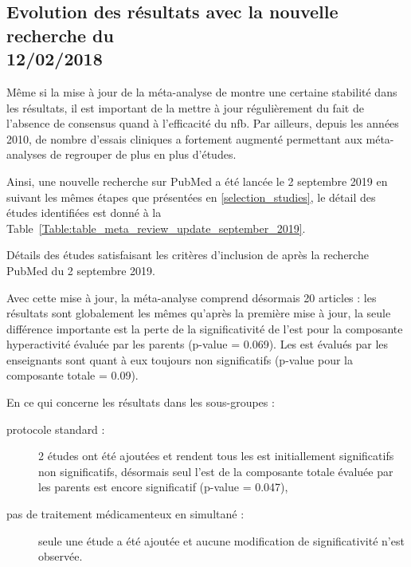 \subsection{Evolution des résultats avec la nouvelle recherche du \\ 12/02/2018}

Même si la mise à jour de la méta-analyse de \citet{Cortese2016} montre une certaine stabilité dans les résultats, il est important de la mettre à jour
régulièrement du fait de l'absence de consensus quand à l'efficacité du \gls{nfb}. Par ailleurs, depuis les années 2010, de nombre d'essais cliniques 
a fortement augmenté permettant aux méta-analyses de regrouper de plus en plus d'études. 

Ainsi, une nouvelle recherche sur PubMed a été lancée le 2 septembre 2019 en suivant les mêmes étapes que présentées en \ref{selection_studies}, le détail
des études identifiées est donné à la Table~\ref{Table:table_meta_review_update_september_2019}.

\begin{table}[h!]
  \centering
  \caption{Détails des études satisfaisant les critères d'inclusion de \citep{Cortese2016} après la recherche PubMed du 2 septembre 2019.}
  
  \label{Table:table_meta_review_update_september_2019}
\end{table} 

Avec cette mise à jour, la méta-analyse comprend désormais 20 articles : les résultats sont globalement les mêmes qu'après la première mise à jour, la seule
différence importante est la perte de la significativité de l'\gls{est} pour la composante hyperactivité évaluée par les parents (p-value = 0.069).
Les \gls{est} évalués par les enseignants sont quant à eux toujours non significatifs (p-value pour la composante totale =  0.09).

En ce qui concerne les résultats dans les sous-groupes :
\begin{description}
\item[protocole standard :] 2 études ont été ajoutées \citep{Aggensteiner2019, Minder2018} et rendent tous les \gls{est} initiallement significatifs 
non significatifs, désormais seul l'\gls{est} de la composante totale évaluée par les parents est encore significatif (p-value = 0.047),
\item [pas de traitement médicamenteux en simultané :] seule une étude a été ajoutée \citep{Moreno2019} et aucune modification de significativité
n'est observée.
\end{description}

